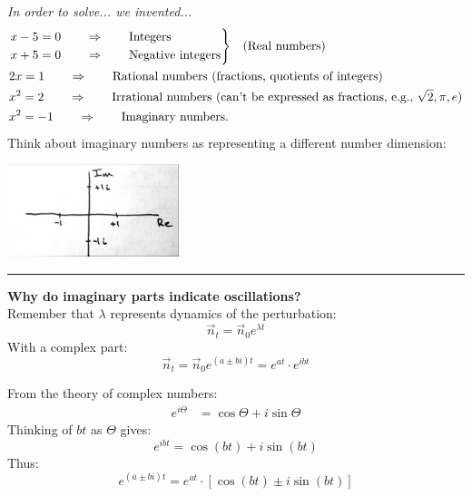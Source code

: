 \documentclass{article}
\newenvironment{rcases}
  {\left.\begin{aligned}}
  {\end{aligned}\right\rbrace}
\begin{document}
\emph{In order to solve... we invented...}
\begin{align*}
	&\begin{rcases}
	x-5 = 0 \qquad &\Rightarrow \qquad \text{Integers}\\
	x+5 = 0 \qquad &\Rightarrow \qquad \text{Negative integers}\\
	\end{rcases}
	\quad\text{(Real numbers)}\\
	&2x = 1 \qquad \Rightarrow \qquad \text{Rational numbers (fractions, quotients of integers)}\\
	&x^2 = 2 \qquad \Rightarrow \qquad \text{Irrational numbers (can't be expressed as fractions, e.g., }\sqrt{2}, \pi, e)\\
	&x^2= -1 \qquad \Rightarrow \qquad \text{Imaginary numbers.}
\end{align*}
Think about imaginary numbers as representing a different number dimension:
 \begin{center}
 	\includegraphics[width=5cm]{figs/Imag.pdf}
 \end{center}
 
\rule[0.5ex]{\linewidth}{1pt}

\textbf{Why do imaginary parts indicate oscillations?}\\
Remember that $\lambda$ represents dynamics of the perturbation:
\begin{equation*}
	\vec{n}_t = \vec{n}_0 e^{\lambda t}
\end{equation*}
With a complex part:
\begin{equation*}
	\vec{n}_t = \vec{n}_0 e^{(a \pm bi) t} = e^{at} \cdot e^{i bt}
\end{equation*}

From the theory of complex numbers:
\begin{align*}
	e^{i \Theta} &= \cos \Theta + i \sin \Theta
\end{align*}
Thinking  of $bt$ as $\Theta$ gives:
\begin{equation*}
	e^{i bt} = \cos (bt) + i\sin (bt)
\end{equation*} 
Thus:
\begin{equation*}
	e^{(a \pm bi) t} =  e^{at} \cdot  [\cos (bt) \pm i\sin (bt)]
\end{equation*} 
\end{document}
